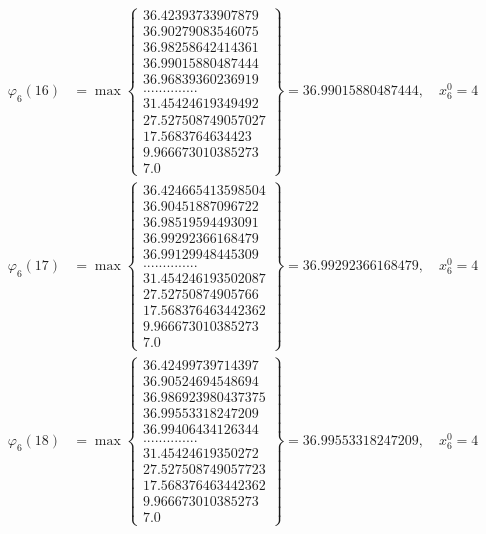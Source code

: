 \documentclass{article}
\begin{document}
\begin{align*}
  
  
  
\varphi_{6}(16) &= \max \left\{ \begin{array}{c}
36.42393733907879 \\
 36.90279083546075 \\
 36.98258642414361 \\
 36.99015880487444 \\
 36.96839360236919 \\
 .............. \\
 31.45424619349492 \\
 27.527508749057027 \\
 17.5683764634423 \\
 9.966673010385273 \\
 7.0
\end{array} \right\} = 36.99015880487444, \quad x_{6}^0 = 4\\
  
  
  
  
\varphi_{6}(17) &= \max \left\{ \begin{array}{c}
36.424665413598504 \\
 36.90451887096722 \\
 36.98519594493091 \\
 36.99292366168479 \\
 36.99129948445309 \\
 .............. \\
 31.454246193502087 \\
 27.52750874905766 \\
 17.568376463442362 \\
 9.966673010385273 \\
 7.0
\end{array} \right\} = 36.99292366168479, \quad x_{6}^0 = 4\\
  
  
  
  
\varphi_{6}(18) &= \max \left\{ \begin{array}{c}
36.42499739714397 \\
 36.90524694548694 \\
 36.986923980437375 \\
 36.99553318247209 \\
 36.99406434126344 \\
 .............. \\
 31.45424619350272 \\
 27.527508749057723 \\
 17.568376463442362 \\
 9.966673010385273 \\
 7.0
\end{array} \right\} = 36.99553318247209, \quad x_{6}^0 = 4\\
  

\end{align*}
\end{document}
